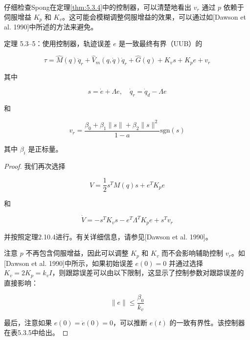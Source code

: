 \documentclass[UTF8,12pt,a4paper]{ctexart}
\begin{document}
仔细检查Spong在定理\ref{thm:5.3.4}中的控制器，可以清楚地看出 $v_r$ 通过 $p$ 依赖于伺服增益 $K_p$ 和 $K_v$。这可能会模糊调整伺服增益的效果，可以通过如[Dawson et al. 1990]中所述的方法来避免。

\begin{theorem}\label{thm:5.3.5}
定理 5.3--5：使用控制器，轨迹误差 $e$ 是一致最终有界（UUB）的

\begin{equation}
\tau = \hat{M}(q)\ddot{q}_r + \hat{V}_m(q, \dot{q})\dot{q}_r + \hat{G}(q) + K_v s + K_p e + v_r
\end{equation}

其中

\begin{equation}
s = \dot{e} + \Lambda e, \quad \dot{q}_r = \dot{q}_d - \Lambda e
\end{equation}

和

\begin{equation}
v_r = \frac{\beta_0 + \beta_1\|s\| + \beta_2\|s\|^2}{1 - a}\text{sgn}(s)
\end{equation}

其中 $\beta_i$ 是正标量。
\end{theorem}

\begin{proof}
我们再次选择

\begin{equation}
V = \frac{1}{2}s^T M(q)s + e^T K_p e
\end{equation}

和

\begin{equation}
\dot{V} = -s^T K_v s - e^T \Lambda^T K_p e + s^T v_r
\end{equation}

并按照定理2.10.4进行。有关详细信息，请参见[Dawson et al. 1990]。

注意 $p$ 不再包含伺服增益，因此可以调整 $K_p$ 和 $K_v$ 而不会影响辅助控制 $v_r$。如[Dawson et al. 1990]中所示，如果初始误差 $e(0) = 0$ 并通过选择 $K_v = 2K_p = k_v I$，则跟踪误差可以由以下限制，这显示了控制参数对跟踪误差的直接影响：

\begin{equation}\label{eq:5.3.15}
\|e\| \leq \frac{\beta_0}{k_v}
\end{equation}

最后，注意如果 $e(0) = \dot{e}(0) = 0$，可以推断 $e(t)$ 的一致有界性。该控制器在表5.3.5中给出。
\end{proof}
\end{document}

